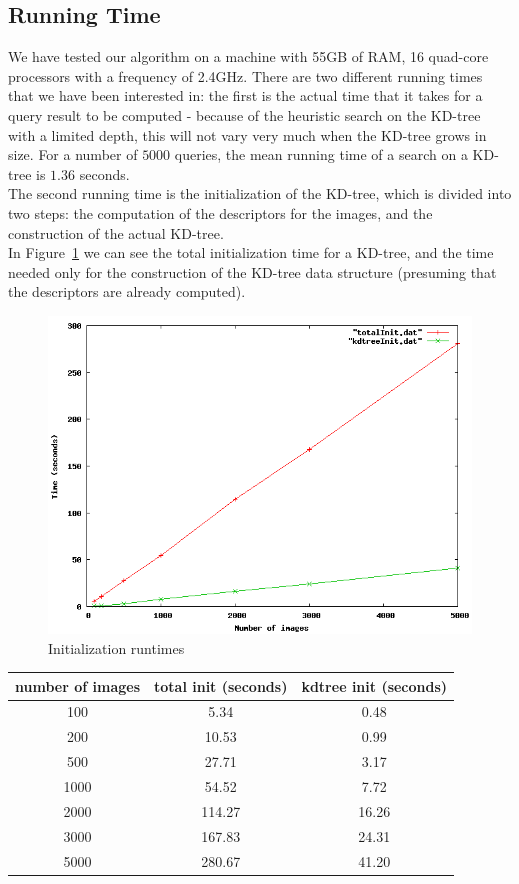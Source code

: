 \documentclass[conference]{IEEEtran}
\begin{document}
\subsection{Running Time}
We have tested our algorithm on a machine with 55GB of RAM, 16 quad-core processors with a frequency of 2.4GHz.
There are two different running times that we have been interested in: the first is the actual time that it takes for a query result to be computed - because of the heuristic search on the KD-tree with a limited depth, this will not vary very much when the KD-tree grows in size. For a number of $5000$ queries, the mean running time of a search on a KD-tree is $1.36$ seconds.\\
The second running time is the initialization of the KD-tree, which is divided into two steps: the computation of the descriptors for the images, and the construction of the actual KD-tree.\\
In Figure~\ref{fig:totalInit} we can see the total initialization time for a KD-tree, and the time needed only for the construction of the KD-tree data structure (presuming that the descriptors are already computed). \\
\begin{figure}[ht!]
\centering
\includegraphics[width=.8\linewidth]{images/totalInit.png}
\caption{Initialization runtimes}
\label{fig:totalInit}
\end{figure}

\begin{tabular} {c | c | c}
	number of images & total init (seconds) & kdtree init (seconds) \\
	\hline
	100 & 5.34 & 0.48 \\
	200 & 10.53 & 0.99 \\
	500 & 27.71 & 3.17 \\
	1000 & 54.52 & 7.72 \\
	2000 & 114.27 & 16.26 \\
	3000 & 167.83 & 24.31 \\
	5000 & 280.67 & 41.20 \\
\end{tabular}
\end{document}
